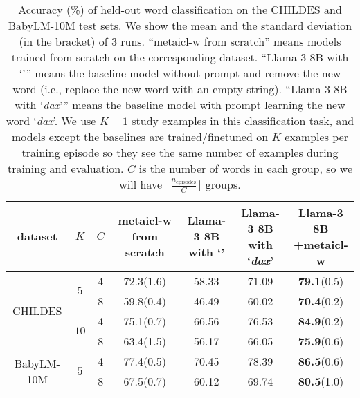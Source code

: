 \documentclass{article}
\begin{document}
\begin{table*}[t]
\small
\begin{center}
\begin{tabular}{ccc|cccc}
\toprule
\textbf{dataset} & $K$ & $C$ & \textbf{\ac{metaicl-w} from scratch} & \makecell{\bf Llama-3 8B \\ \bf with `'} & \makecell{\bf Llama-3 8B \\ \bf with `\textit{dax}'} & \makecell{\bf Llama-3 8B \\ \bf +\ac{metaicl-w}} \\
\midrule
\multirow{4}{*}{CHILDES}
        & \multirow{2}{*}{$5$}
              &   4 &            72.3(1.6) &         58.33 &            71.09 &            \textbf{79.1}(0.5) \\
        &     &   8 &            59.8(0.4) &         46.49 &            60.02 &            \textbf{70.4}(0.2) \\
\cmidrule{2-7}
        & \multirow{2}{*}{$10$}
              &   4 &            75.1(0.7) &         66.56 &            76.53 &            \textbf{84.9}(0.2) \\
        &     &   8 &            63.4(1.5) &         56.17 &            66.05 &            \textbf{75.9}(0.6) \\
\midrule
\multirow{2}{*}{BabyLM-10M}
        & \multirow{2}{*}{$5$}
              &   4 &            77.4(0.5) &         70.45 &            78.39 &            \textbf{86.5}(0.6) \\
        &     &   8 &            67.5(0.7) &         60.12 &            69.74 &            \textbf{80.5}(1.0) \\
\bottomrule
\end{tabular}
\end{center}
\caption{Accuracy (\%) of held-out word classification on the CHILDES and BabyLM-10M test sets.
We show the mean and the standard deviation (in the bracket) of 3 runs.
``\ac{metaicl-w} from scratch'' means models trained from scratch on the corresponding dataset.
``Llama-3 8B with `''' means the baseline model without prompt and remove the new word (i.e., replace the new word with an empty string).
``Llama-3 8B with `\textit{dax}''' means the baseline model with prompt learning the new word `\textit{dax}'.
We use $K-1$ study examples in this classification task, and models except the baselines are trained/finetuned on $K$ examples per training episode so they see the same number of examples during training and evaluation.
$C$ is the number of words in each group, so we will have $\lfloor \frac{n_\text{episodes}}{C} \rfloor$ groups.
}
\end{table*}
\end{document}
